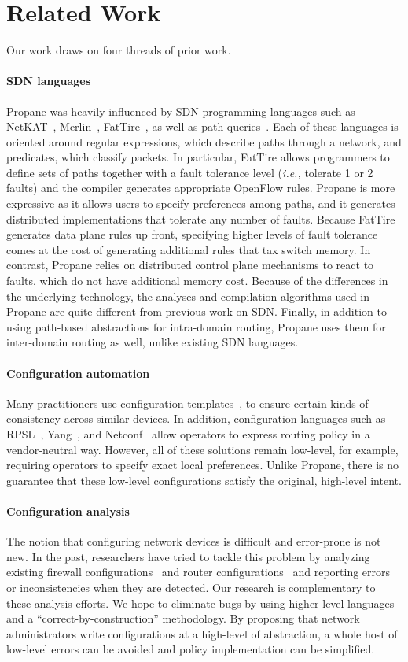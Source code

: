 \documentclass[10pt]{sigalternate052015}
\newcommand{\sysname}{{\small \sf Propane}\xspace}
\newcommand{\para}[1]{\paragraph*{\textbf{#1}}}
\begin{document}
%
%
%
%

\section{Related Work}
\label{sec:related}

Our work draws on four threads of prior work.

\para{SDN languages}
\sysname{} was heavily influenced by SDN programming
languages such as NetKAT~\cite{netkat}, Merlin~\cite{foster:merlin}, FatTire~\cite{fattire},
as well as path queries~\cite{queries}.
Each of these languages is oriented around regular expressions, which
describe paths through a network, and predicates, which classify packets.
In particular, FatTire allows programmers to define sets of paths together
with a fault tolerance level (\emph{i.e.,} tolerate 1 or 2 faults)
and the compiler generates appropriate OpenFlow rules.
\sysname is more expressive as it allows users to specify preferences among
paths, and it generates distributed implementations that tolerate any number of faults.
Because FatTire generates data plane rules up front,
specifying higher levels of fault tolerance comes
at the cost of generating additional rules that tax switch memory.
In contrast, \sysname relies on distributed
control plane mechanisms to react to faults, which do not have additional memory cost.
Because of the differences in the underlying technology, the analyses
and compilation algorithms used in \sysname are quite different from
previous work on SDN.
Finally, in addition to using path-based abstractions
for intra-domain routing, \sysname uses them for inter-domain routing as
well, unlike existing SDN languages.

\para{Configuration automation}
Many practitioners use configuration templates~\cite{hatch,thwack}, to ensure certain kinds of consistency across similar devices. In addition, configuration languages such as RPSL~\cite{RFC2622}, Yang~\cite{RFC6020}, and Netconf~\cite{RFC6241} allow operators to express routing policy in a vendor-neutral way.
However, all of these solutions remain low-level, for example, requiring operators to specify exact local preferences. Unlike \sysname, there is no guarantee that these low-level configurations satisfy the original, high-level intent.

\para{Configuration analysis}
The notion that configuring network devices is difficult and error-prone is not new.
In the past, researchers have tried to tackle this problem by analyzing existing
firewall configurations~\cite{fang,lumeta,margrave} and
router configurations~\cite{feamster+:rcc,feamster:thesis,ipassure,batfish,bagpipe,arc} and reporting errors or inconsistencies when they are detected.
Our research is complementary to these analysis
efforts.  We hope to eliminate bugs by using higher-level
languages and a ``correct-by-construction''
methodology.  By proposing that network administrators write configurations
at a high-level of abstraction, a whole host of low-level errors can be avoided and policy implementation can be simplified.
\end{document}
